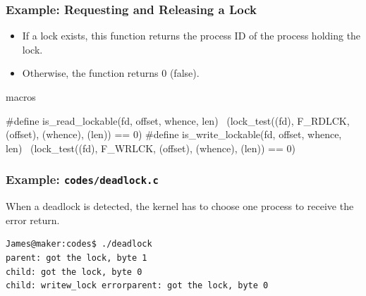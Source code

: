 \documentclass[newPxFont,sthlmFooter,nooffset]{beamer}
\begin{document}
\begin{frame}[t, fragile]
  \frametitle{Example: Requesting and Releasing a Lock}

  \begin{itemize}
  \item If a lock exists, this function returns the process ID of the
    process holding the lock.
  \item Otherwise, the function returns 0 (false).
  \end{itemize}

macros
\begin{codedef}
#define is_read_lockable(fd, offset, whence, len) \
        (lock_test((fd), F_RDLCK, (offset), (whence), (len)) == 0)
#define is_write_lockable(fd, offset, whence, len) \
        (lock_test((fd), F_WRLCK, (offset), (whence), (len)) == 0)
\end{codedef}

\end{frame}

\begin{frame}
  \frametitle{Example: \texttt{codes/deadlock.c}}

  
  
When a deadlock is detected, the kernel has to choose one process to receive the error return.

\begin{verbatim}
James@maker:codes$ ./deadlock
parent: got the lock, byte 1
child: got the lock, byte 0
child: writew_lock errorparent: got the lock, byte 0
\end{verbatim}
\end{frame}
\end{document}
